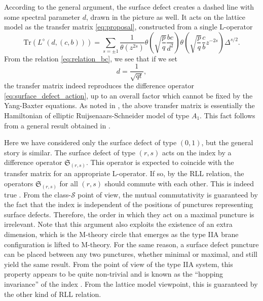 According to the general argument, the surface defect creates a dashed line
with some spectral parameter $d$, drawn in the picture as well. It acts
on the lattice model as the transfer matrix \eqref{eq:proposal},
constructed from a single L-operator
\begin{equation}
    \mathrm{Tr}\left(L^{\diamond}(d,(c,b))\right)
      =
        \sum_{s=\pm1}\frac{1}{\theta(z^{2s})}
        \theta\left(\sqrt{\frac{p}{q}}\frac{bc}{d^{2}}\right)
        \theta\left(\sqrt{\frac{p}{q}}\frac{c}{b}z^{-2s}\right)
        \Delta^{s/2}.
  \label{eq:transfer_fromL}
\end{equation}
From the relation \eqref{eq:relation_bc}, we see that if we set
\begin{equation}
    d  =  \frac{1}{\sqrt{qt}},
\end{equation}
the transfer matrix indeed reproduces the difference operator \eqref{eq:surface_defect_action},
up to an overall factor which cannot be fixed by the Yang-Baxter equations.
As noted in \cite{Gaiotto:2012xa}, the above transfer matrix
is essentially the Hamiltonian of elliptic Ruijsenaars-Schneider model
\cite{MR851627,Ruijsenaars:1986pp} of type $A_{1}$. This fact
follows from a general result obtained in \cite{MR1463830}.

Here we have considered only the surface defect of type $(0,1)$,
but the general story is similar. The surface defect of type $(r,s)$
acts on the index by a difference operator $\mathfrak{S}_{(r,s)}$.
This operator is expected to coincide with the transfer matrix for
an appropriate L-operator. If so, by the RLL relation, the operators
$\mathfrak{S}_{(r,s)}$ for all $(r,s)$ should commute with each
other. This is indeed true \cite{Gaiotto:2012xa}. From the class-$\mathcal{S}$
point of view, the mutual commutativity is guaranteed by the fact
that the index is independent of the positions of punctures representing
surface defects. Therefore, the order in which they act on a maximal
puncture is irrelevant. Note that this argument also exploits the
existence of an extra dimension, which is the M-theory circle that
emerges as the type IIA brane configuration is lifted to M-theory.
For the same reason, a surface defect puncture can be placed between
any two punctures, whether minimal or maximal, and still yield the
same result. From the point of view of the type IIA system, this property
appears to be quite non-trivial and is known as the ``hopping invariance''
of the index \cite{Gadde:2013dda}. From the lattice model viewpoint,
this is guaranteed by the other kind of RLL relation.


